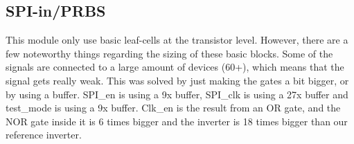 
\subsection{SPI-in/PRBS}
This module only use basic leaf-cells at the transistor level. However, there are a few noteworthy things regarding the sizing of these basic blocks. Some of the signals are connected to a large amount of devices (60+), which means that the signal gets really weak. This was solved by just making the gates a bit bigger, or by using a buffer. SPI\_en is using a 9x buffer, SPI\_clk is using a 27x buffer and test\_mode is using a 9x buffer. Clk\_en is the result from an OR gate, and the NOR gate inside it is 6 times bigger and the inverter is 18 times bigger than our reference inverter.

